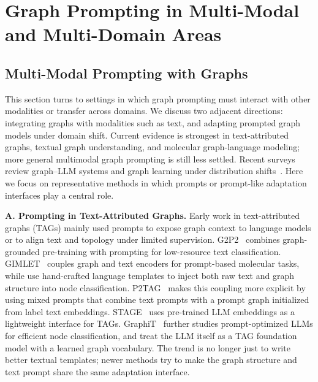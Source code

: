 \section{Graph Prompting in Multi-Modal and Multi-Domain Areas}\label{sec:pmodal}

\subsection{Multi-Modal Prompting with Graphs}\label{subsec:multi_modal}

This section turns to settings in which graph prompting must interact with other modalities or transfer across domains. We discuss two adjacent directions: integrating graphs with modalities such as text, and adapting prompted graph models under domain shift. Current evidence is strongest in text-attributed graphs, textual graph understanding, and molecular graph-language modeling; more general multimodal graph prompting is still less settled. Recent surveys review graph--LLM systems and graph learning under distribution shifts~\cite{ren2024surveyllmgraph,wu2024graphshifts,shi2024graphdomain}. Here we focus on representative methods in which prompts or prompt-like adaptation interfaces play a central role.




\textbf{A. Prompting in Text-Attributed Graphs.} Early work in text-attributed graphs (TAGs) mainly used prompts to expose graph context to language models or to align text and topology under limited supervision. G2P2~\cite{wen2023augmenting} combines graph-grounded pre-training with prompting for low-resource text classification. GIMLET~\cite{zhao2023gimlet} couples graph and text encoders for prompt-based molecular tasks, while \citet{li2023promptbased} use hand-crafted language templates to inject both raw text and graph structure into node classification. P2TAG~\cite{zhao2024p2tag} makes this coupling more explicit by using mixed prompts that combine text prompts with a prompt graph initialized from label text embeddings. STAGE~\cite{zolnai2024stage} uses pre-trained LLM embeddings as a lightweight interface for TAGs. GraphiT~\cite{khoshraftar2025graphit} further studies prompt-optimized LLMs for efficient node classification, and \citet{zhu2025llmasgnn} treat the LLM itself as a TAG foundation model with a learned graph vocabulary. The trend is no longer just to write better textual templates; newer methods try to make the graph structure and text prompt share the same adaptation interface.



